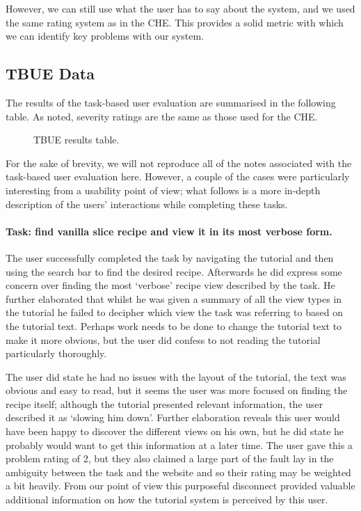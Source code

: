 However, we can still use what the user has to say about the system,
and we used the same rating system as in the CHE. This provides a
solid metric with which we can identify key problems with our system.

\subsection{TBUE Data}

The results of the task-based user evaluation are summarised in the
following table. As noted, severity ratings are the same as those used
for the CHE.

\begin{figure}[htbp]
  
  \caption{TBUE results table.}
  \label{tbue1}
\end{figure}


For the sake of brevity, we will not reproduce all of the notes
associated with the task-based user evaluation here. However, a couple
of the cases were particularly interesting from a usability point of
view; what follows is a more in-depth description of the users'
interactions while completing these tasks.

\paragraph{Task: find vanilla slice recipe and view it in its most verbose form.}

The user successfully completed the task by navigating the tutorial
and then using the search bar to find the desired recipe. Afterwards
he did express some concern over finding the most `verbose' recipe
view described by the task. He further elaborated that whilst he was
given a summary of all the view types in the tutorial he failed to
decipher which view the task was referring to based on the tutorial
text. Perhaps work needs to be done to change the tutorial text to
make it more obvious, but the user did confess to not reading the
tutorial particularly thoroughly.

The user did state he had no issues with the layout of the tutorial,
the text was obvious and easy to read, but it seems the user was more
focused on finding the recipe itself; although the tutorial presented
relevant information, the user described it as `slowing him
down'. Further elaboration reveals this user would have been happy to
discover the different views on his own, but he did state he probably
would want to get this information at a later time. The user gave this
a problem rating of 2, but they also claimed a large part of the fault
lay in the ambiguity between the task and the website and so their
rating may be weighted a bit heavily. From our point of view this
purposeful disconnect provided valuable additional information on how
the tutorial system is perceived by this user.

